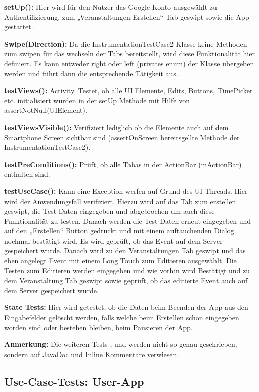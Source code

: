 \textbf{setUp():} Hier wird für den Nutzer das Google Konto ausgewählt zu Authentifizierung, zum „Veranstaltungen Erstellen“ Tab geswipt sowie die App gestartet.

\textbf{Swipe(Direction):} Da die InstrumentationTestCase2 Klasse keine Methoden zum swipen für das wechseln der Tabs bereitstellt, wird diese Funktionalität hier definiert. Es kann entweder right oder left (privates enum) der Klasse übergeben werden und führt dann die entsprechende Tätigkeit aus.

\textbf{testViews():} Activity, Testet, ob alle UI Elemente, Edits, Buttons, TimePicker etc. initialisiert wurden in der setUp Methode mit Hilfe von assertNotNull(UIElement).

\textbf{testViewsVisible():} Verifiziert lediglich ob die Elemente auch auf dem Smartphone Screen sichtbar sind (assertOnScreen bereitsgellte Methode der InstrumentationTestCase2).

\textbf{testPreConditions():} Prüft, ob alle Tabas in der ActionBar (mActionBar) enthalten sind.

\textbf{testUseCase():} Kann eine Exception werfen auf Grund des UI Threads. Hier wird der Anwendungsfall verifiziert. Hierzu wird auf das Tab zum erstellen geswipt, die Test Daten eingegeben und abgebrochen um auch diese Funktionalität zu testen. Danach werden die Test Daten erneut eingegeben und auf den „Erstellen“ Button gedrückt und mit einem auftauchenden Dialog nochmal bestätigt wird. Es wird geprüft, ob das Event auf dem Server gespeichert wurde. Danach wird zu den Veranstaltungen Tab geswipt und das eben angelegt Event mit einem Long Touch zum Editieren ausgewählt. Die Testen zum Editieren werden eingegeben und wie vorhin wird Bestätigt und zu dem Veranstaltung Tab geswipt sowie geprüft, ob das editierte Event auch auf dem Server gespeichert wurde.

\textbf{State Tests:} Hier wird getestet, ob die Daten beim Beenden der App aus den Eingabefelder gelöscht werden, falls welche beim Erstellen schon eingegeben worden sind oder bestehen bleiben, beim Pausieren der App.

\textbf{Anmerkung:} Die weiteren Tests ,  und  werden nicht so genau geschrieben, sondern auf JavaDoc und Inline Kommentare verwiesen.


\subsection{Use-Case-Tests: User-App}
